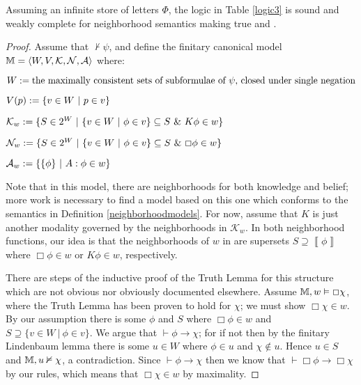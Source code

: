 \begin{theorem}
  Assuming an infinite store of letters $\Phi$, the logic in Table
  \ref{logic3} is sound and weakly complete for neighborhood semantics making
  true  and .
\end{theorem}

\begin{proof}
  Assume that $\nvdash \psi$, and define the finitary canonical model
  $\mathbbm{M}= \langle W, V, \mathcal{K}, \mathcal{N}, \mathcal{A} \rangle$
  where:
  \begin{itemizedot}
    \item $W \assign \text{the maximally consistent sets of subformulae of
    $\psi$, closed under single negation}$
    
    \item $V (p) \assign \{v \in W \  | \  p \in v\}$
    
    \item $\mathcal{K}_w \assign \{S \in 2^W \  | \  \{v
    \in W \  | \  \phi \in v\} \subseteq S \  \&
    \  K \phi \in w\}$
    
    \item $\mathcal{N}_w \assign \{S \in 2^W \  | \  \{v
    \in W \  | \  \phi \in v\} \subseteq S \  \&
    \  \Box \phi \in w\}$
    
    \item $\mathcal{A}_w \assign \{\{\phi\} \  | \  A :
    \phi \in w\}$
  \end{itemizedot}
  Note that in this model, there are neighborhoods for both knowledge and
  belief; more work is necessary to find a model based on this one which
  conforms to the semantics in Definition \ref{neighborhoodmodels}.  For now,
  assume that $K$ is just another modality governed by the neighborhoods in
  $\mathcal{K}_w$.  In both neighborhood functions, our idea is that the
  neighborhoods of $w$ in are supersets $S \supseteq \left\llbracket \phi
  \right\rrbracket$ where $\Box \phi \in w$ or $K \phi \in w$, respectively.
  
  
  
  There are steps of the inductive proof of the Truth Lemma for this structure
  which are not obvious nor obviously documented elsewhere.  Assume
  $\mathbbm{M}, w \vDash \Box \chi$, where the Truth Lemma has been proven to
  hold for $\chi$; we must show $\Box \chi \in w$.  By our assumption there
  is some $\phi$ and $S$ where $\Box \phi \in w$ and $S \supseteq \{v \in W
  \  | \  \phi \in v\}$.  We argue that $\vdash \phi
  \rightarrow \chi$; for if not then by the finitary Lindenbaum lemma there is
  some $u \in W$ where $\phi \in u$ and $\chi \nin u$.  Hence $u \in S$ and
  $\mathbbm{M}, u \nvDash \chi$, a contradiction.  Since $\vdash \phi
  \rightarrow \chi$ then we know that $\vdash \Box \phi \rightarrow \Box \chi$
  by our rules, which means that $\Box \chi \in w$ by maximality.
  

\end{proof}
